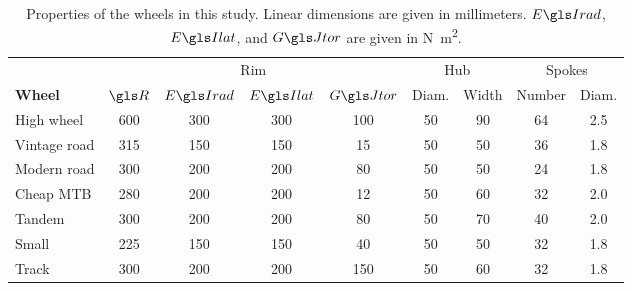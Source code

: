 \documentclass[../../thesis.tex]{subfiles}
\begin{document}
\begin{table}
\caption{Properties of the wheels in this study. Linear dimensions are given in millimeters. $\EIr$, $\EIl$, and $\GJ$ are given in \si{N.m^2}.}
\label{tab:example_wheel_props}
\begin{tabular}{l|cccc|cc|cc}
\hline
&\multicolumn{4}{c|}{Rim} & \multicolumn{2}{c|}{Hub} & \multicolumn{2}{c}{Spokes}\\
\bf{Wheel} & $\R$ & $\EIr$ & $\EIl$ & $\GJ$ & Diam. & Width & Number & Diam.\\
\hline
High wheel   & 600 & 300 & 300 & 100 & 50 & 90 & 64 & 2.5\\
Vintage road & 315 & 150 & 150 & 15  & 50 & 50 & 36 & 1.8\\
Modern road  & 300 & 200 & 200 & 80  & 50 & 50 & 24 & 1.8\\
Cheap MTB    & 280 & 200 & 200 & 12  & 50 & 60 & 32 & 2.0\\
Tandem       & 300 & 200 & 200 & 80  & 50 & 70 & 40 & 2.0\\
Small        & 225 & 150 & 150 & 40  & 50 & 50 & 32 & 1.8\\
Track        & 300 & 200 & 200 & 150 & 50 & 60 & 32 & 1.8\\
\hline
\end{tabular}
\end{table}
\end{document}
